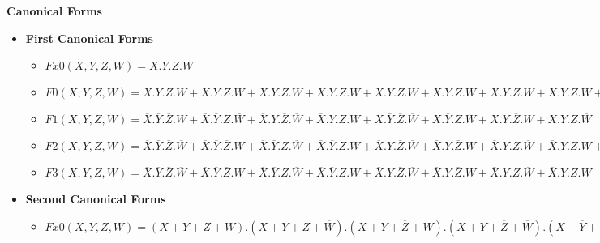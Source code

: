 \textbf{Canonical Forms }
\begin{itemize}
\item \textbf{First Canonical Forms }
    \begin{itemize}
    
        \item $Fx0(X, Y, Z, W) =  X.Y.Z.W$
    
        \item $F0(X, Y, Z, W) =  \overline{X}.\overline{Y}.Z.W + \overline{X}.Y.\overline{Z}.W + \overline{X}.Y.Z.\overline{W} + \overline{X}.Y.Z.W + X.\overline{Y}.\overline{Z}.W + X.\overline{Y}.Z.\overline{W} + X.\overline{Y}.Z.W + X.Y.\overline{Z}.\overline{W} + X.Y.\overline{Z}.W + X.Y.Z.\overline{W}$
    
        \item $F1(X, Y, Z, W) =  \overline{X}.\overline{Y}.\overline{Z}.W + \overline{X}.\overline{Y}.Z.\overline{W} + \overline{X}.Y.\overline{Z}.\overline{W} + \overline{X}.Y.Z.W + X.\overline{Y}.\overline{Z}.\overline{W} + X.\overline{Y}.Z.W + X.Y.\overline{Z}.W + X.Y.Z.\overline{W}$
    
        \item $F2(X, Y, Z, W) =  \overline{X}.\overline{Y}.\overline{Z}.\overline{W} + \overline{X}.\overline{Y}.\overline{Z}.W + \overline{X}.\overline{Y}.Z.\overline{W} + \overline{X}.\overline{Y}.Z.W + \overline{X}.Y.\overline{Z}.\overline{W} + \overline{X}.Y.\overline{Z}.W + \overline{X}.Y.Z.\overline{W} + \overline{X}.Y.Z.W + X.\overline{Y}.Z.W + X.Y.\overline{Z}.\overline{W}$
    
        \item $F3(X, Y, Z, W) =  \overline{X}.\overline{Y}.\overline{Z}.\overline{W} + \overline{X}.\overline{Y}.\overline{Z}.W + \overline{X}.\overline{Y}.Z.\overline{W} + \overline{X}.\overline{Y}.Z.W + \overline{X}.Y.\overline{Z}.\overline{W} + \overline{X}.Y.\overline{Z}.W + \overline{X}.Y.Z.\overline{W} + \overline{X}.Y.Z.W$
    
    \end{itemize}

\item \textbf{Second Canonical Forms }
    \begin{itemize}
    
        \item $Fx0(X, Y, Z, W) =  (X+Y+Z+W) . (X+Y+Z+\overline{W}) . (X+Y+\overline{Z}+W) . (X+Y+\overline{Z}+\overline{W}) . (X+\overline{Y}+Z+W) . (X+\overline{Y}+Z+\overline{W}) . (X+\overline{Y}+\overline{Z}+W) . (X+\overline{Y}+\overline{Z}+\overline{W}) . (\overline{X}+Y+Z+W) . (\overline{X}+Y+Z+\overline{W}) . (\overline{X}+Y+\overline{Z}+W) . (\overline{X}+Y+\overline{Z}+\overline{W}) . (\overline{X}+\overline{Y}+Z+W) . (\overline{X}+\overline{Y}+Z+\overline{W}) . (\overline{X}+\overline{Y}+\overline{Z}+W)$
    

\end{itemize}
\end{itemize}
